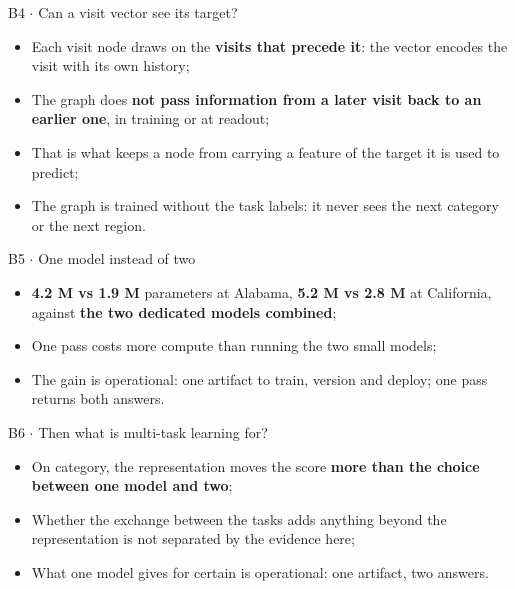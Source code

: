 \documentclass{beamer}
\begin{document}
\begin{frame}{B4 $\cdot$ Can a visit vector see its target?}
    \vspace{0pt}%
    \begin{itemize}\setlength{\itemsep}{2.2ex}
        \item Each visit node draws on the \textbf{visits that precede it}: the vector encodes the
              visit with its own history;
        \item The graph does \textbf{not pass information from a later visit back to an earlier
              one}, in training or at readout;
        \item That is what keeps a node from carrying a feature of the target it is used to predict;
        \item The graph is trained without the task labels: it never sees the next category or the
              next region.
    \end{itemize}
\end{frame}

\begin{frame}{B5 $\cdot$ One model instead of two}
    \vspace{0pt}%
    \begin{itemize}\setlength{\itemsep}{2.2ex}
        \item \textbf{4.2 M vs 1.9 M} parameters at Alabama, \textbf{5.2 M vs 2.8 M} at California,
              against \textbf{the two dedicated models combined};
        \item One pass costs more compute than running the two small models;
        \item The gain is \alert{operational}: one artifact to train, version and deploy; one pass
              returns both answers.
    \end{itemize}
\end{frame}

\begin{frame}{B6 $\cdot$ Then what is multi-task learning for?}
    \vspace{0pt}%
    \begin{itemize}\setlength{\itemsep}{2.2ex}
        \item On category, the representation moves the score \textbf{more than the choice between
              one model and two};
        \item Whether the exchange between the tasks adds anything beyond the representation is
              \alert{not separated by the evidence here};
        \item What one model gives for certain is operational: one artifact, two answers.
    \end{itemize}
\end{frame}
\end{document}
